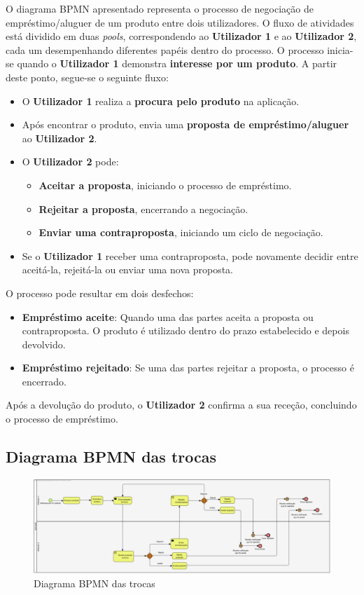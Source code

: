 \documentclass[a4paper, 12pt]{article} %
\begin{document}
O diagrama BPMN apresentado representa o processo de negociação de empréstimo/aluguer de um produto entre dois utilizadores. O fluxo de atividades está dividido em duas \textit{pools}, correspondendo ao \textbf{Utilizador 1} e ao \textbf{Utilizador 2}, cada um desempenhando diferentes papéis dentro do processo. O processo inicia-se quando o \textbf{Utilizador 1} demonstra \textbf{interesse por um produto}. A partir deste ponto, segue-se o seguinte fluxo:

\begin{itemize}
	\item O \textbf{Utilizador 1} realiza a \textbf{procura pelo produto} na aplicação.
	\item Após encontrar o produto, envia uma \textbf{proposta de empréstimo/aluguer} ao \textbf{Utilizador 2}.
	\item O \textbf{Utilizador 2} pode:
	\begin{itemize}
		\item \textbf{Aceitar a proposta}, iniciando o processo de empréstimo.
		\item \textbf{Rejeitar a proposta}, encerrando a negociação.
		\item \textbf{Enviar uma contraproposta}, iniciando um ciclo de negociação.
	\end{itemize}
	\item Se o \textbf{Utilizador 1} receber uma contraproposta, pode novamente decidir entre aceitá-la, rejeitá-la ou enviar uma nova proposta.
\end{itemize}

O processo pode resultar em dois desfechos:
\begin{itemize}
	\item \textbf{Empréstimo aceite}: Quando uma das partes aceita a proposta ou contraproposta. O produto é utilizado dentro do prazo estabelecido e depois devolvido.
	\item \textbf{Empréstimo rejeitado}: Se uma das partes rejeitar a proposta, o processo é encerrado.
\end{itemize}

Após a devolução do produto, o \textbf{Utilizador 2} confirma a sua receção, concluindo o processo de empréstimo.

\newpage
\subsection{Diagrama BPMN das trocas}

\begin{figure}[ht]
	\centering
	\includegraphics[width=\textwidth]{../images/bpmn-swaps.png}
	\caption{Diagrama BPMN das trocas}
	\label{fig:bpmn trocas}
\end{figure}
\end{document}
